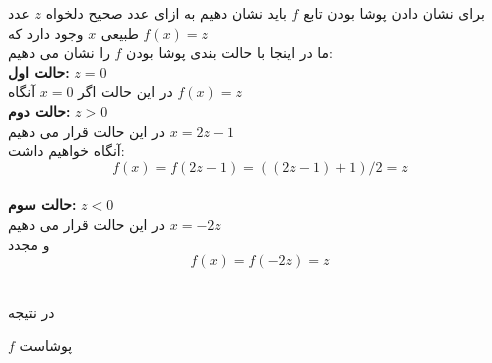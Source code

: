 \begin{ans}
    برای نشان دادن پوشا بودن تابع 
    $f$
    باید نشان دهیم به ازای عدد صحیح دلخواه 
    $z$
    عدد طبیعی
    $x$
    وجود دارد که 
    $f(x) = z$
    \\
    ما در اینجا با حالت بندی پوشا بودن 
    $f$
    را نشان می دهیم:
    \\
    \textbf{حالت اول: } 
    $z = 0$
    \\
    در این حالت اگر
    $x = 0$
    آنگاه
    $f(x) = z$
    \\
    \textbf{حالت دوم:}
    $z > 0$
    \\
    در این حالت قرار می دهیم 
    $x = 2z - 1$
    \\
    آنگاه خواهیم داشت:
    \[f(x) = f(2z-1) = ((2z-1)+1)/2 = z\]
    \\
    \textbf{حالت سوم:}
    $z < 0$
    \\
    در این حالت قرار می دهیم
    $x = -2z$
    \\
    و مجدد
    \[f(x) = f(-2z) = z\]

    \\
    در نتیجه
    
    $f$
    پوشاست 

\end{ans}
